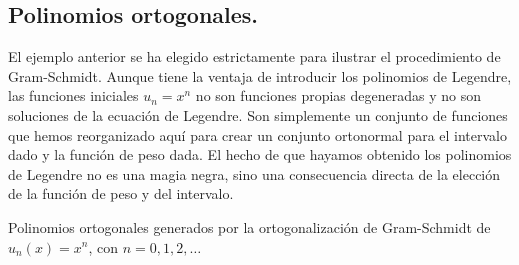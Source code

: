\subsection{Polinomios ortogonales.}
El ejemplo anterior se ha elegido estrictamente para ilustrar el procedimiento de Gram-Schmidt. Aunque tiene la ventaja de introducir los polinomios de Legendre, las funciones iniciales $u_{n} = x^{n}$ no son funciones propias degeneradas y no son soluciones de la ecuación de Legendre. Son simplemente un conjunto de funciones que hemos reorganizado aquí para crear un conjunto ortonormal para el intervalo dado y la función de peso dada. El hecho de que hayamos obtenido los polinomios de Legendre no es una magia negra, sino una consecuencia directa de la elección de la función de peso y del intervalo.
\par
Polinomios ortogonales generados por la ortogonalización de Gram-Schmidt de $u_{n}(x)= x^{n}$, con $n=0,1,2,\ldots$

